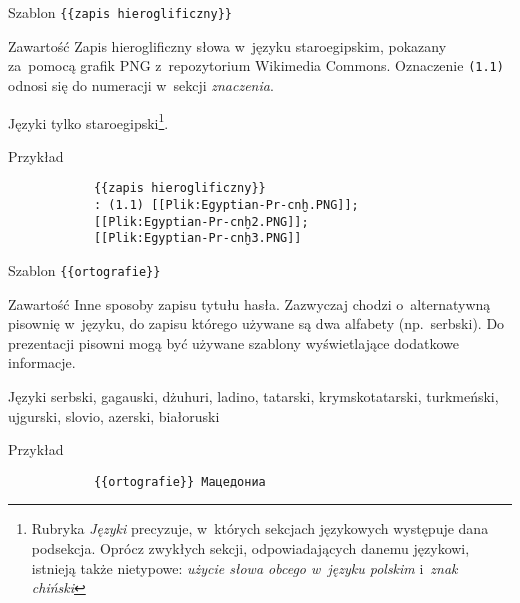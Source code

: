 \documentclass{pracamgr}
\begin{document}
\begin{description-sub}
	\item[Szablon] \verb|{{zapis hieroglificzny}}|
	\item[Zawartość] Zapis hieroglificzny słowa w~języku staroegipskim, pokazany za~pomocą grafik PNG z~repozytorium Wikimedia Commons. Oznaczenie \verb|(1.1)| odnosi się do numeracji w~sekcji \emph{znaczenia}.
	\item[Języki] tylko staroegipski\footnote{Rubryka \emph{Języki} precyzuje, w~których sekcjach językowych występuje dana podsekcja. Oprócz zwykłych sekcji, odpowiadających danemu językowi, istnieją także nietypowe: \emph{użycie słowa obcego w~języku polskim} i~\emph{znak chiński}}.
	\item[Przykład]
		\begin{verbatim}
			{{zapis hieroglificzny}}
			: (1.1) [[Plik:Egyptian-Pr-cnḫ.PNG]];
			[[Plik:Egyptian-Pr-cnḫ2.PNG]];
			[[Plik:Egyptian-Pr-cnḫ3.PNG]]
		\end{verbatim}
\end{description-sub}
\spacer
\begin{description-sub}
	\item[Szablon] \verb|{{ortografie}}|
	\item[Zawartość] Inne sposoby zapisu tytułu hasła. Zazwyczaj chodzi o~alternatywną pisownię w~języku, do zapisu którego używane są dwa alfabety (np.\ serbski). Do prezentacji pisowni mogą być używane szablony wyświetlające dodatkowe informacje.
	\item[Języki] serbski, gagauski, dżuhuri, ladino, tatarski, krymskotatarski, turkmeński, ujgurski, slovio, azerski, białoruski
	\item[Przykład]
		\begin{verbatim}
			{{ortografie}} Мацедониа
		\end{verbatim}
\end{description-sub}
\spacer
\end{document}

